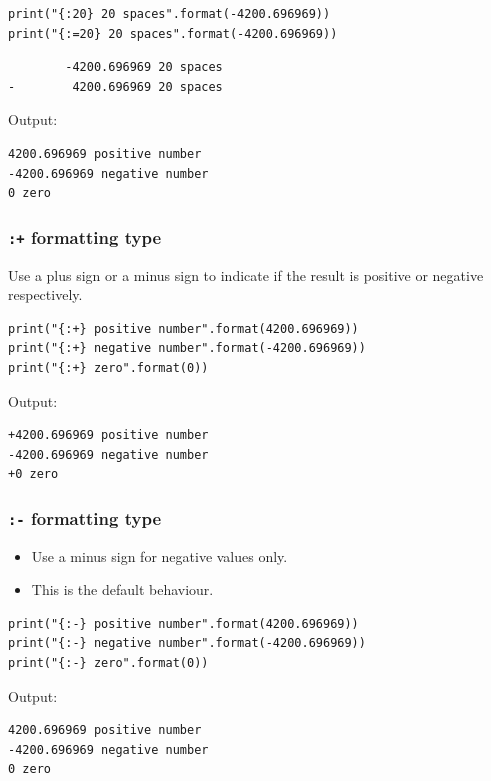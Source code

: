 \documentclass[11pt]{article}
\begin{document}
\begin{verbatim}
print("{:20} 20 spaces".format(-4200.696969))
print("{:=20} 20 spaces".format(-4200.696969))
\end{verbatim}

\begin{verbatim}
        -4200.696969 20 spaces
-        4200.696969 20 spaces
\end{verbatim}


 \noindent Output:

\begin{verbatim}
4200.696969 positive number
-4200.696969 negative number
0 zero
\end{verbatim}

\subsubsection{\texttt{:+} formatting type}
\label{sec:orgea386cc}
Use a plus sign or a minus sign to indicate if the result is positive or negative respectively.

\begin{verbatim}
print("{:+} positive number".format(4200.696969))
print("{:+} negative number".format(-4200.696969))
print("{:+} zero".format(0))
\end{verbatim}

 \noindent Output:

\begin{verbatim}
+4200.696969 positive number
-4200.696969 negative number
+0 zero
\end{verbatim}

\subsubsection{\texttt{:-} formatting type}
\label{sec:org368365f}
\begin{itemize}
\item Use a minus sign for negative values only.
\item This is the default behaviour.
\end{itemize}

\begin{verbatim}
print("{:-} positive number".format(4200.696969))
print("{:-} negative number".format(-4200.696969))
print("{:-} zero".format(0))
\end{verbatim}

 \noindent Output:

\begin{verbatim}
4200.696969 positive number
-4200.696969 negative number
0 zero
\end{verbatim}
\end{document}
